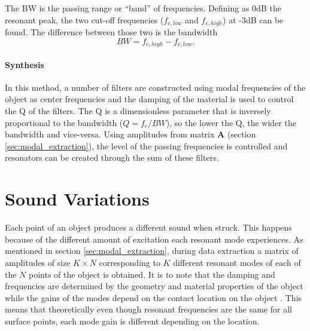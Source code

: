 The \gls{BW} is the passing range or ``band'' of frequencies. Defining as 0dB the resonant peak, the two cut-off frequencies ($f_{c,low}$ and $f_{c,high}$) at -3dB can be found. The difference between those two is the bandwidth  
\begin{equation}\label{eq:bw}
BW = f_{c,high}-f_{c,low}.
\end{equation} \cite{bib:bpf}  

\paragraph{Synthesis}\label{par:synth}
\hfill \break

In this method, a number of filters are constructed using modal frequencies of the object as center frequencies and the damping of the material is used to control the \gls{Q} of the filters.  The \gls{Q} is a dimensionless parameter that is inversely proportional to the bandwidth ($Q=f_c/BW$), so the lower the \gls{Q}, the wider the bandwidth and vice-versa. Using amplitudes from matrix \textbf{A} (section \ref{sec:modal_extraction}), the level of the passing frequencies is controlled and resonators can be created through the sum of these filters. 

\section{Sound Variations} \label{sec:sound_variation}
Each point of an object produces a different sound when struck. This happens because of the different amount of excitation each resonant mode experiences. As mentioned in section \ref{sec:modal_extraction}, during data extraction a matrix of amplitudes of size $K\times N$ corresponding to $K$ different resonant modes of each of the $N$ points of the object is obtained. It is to note that the damping and frequencies are determined by the geometry and material properties of the object while the gains of the modes depend on the contact location on the
object \cite{van2001foleyautomatic}. This means that theoretically even though resonant frequencies are the same for all surface points, each mode gain is different depending on the location.

